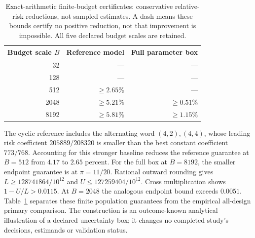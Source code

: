 \begin{table}[t]
\centering
\caption{Exact-arithmetic finite-budget certificates: conservative relative-risk reductions, not sampled estimates.
A dash means these bounds certify no positive reduction, not that improvement is impossible.
All five declared budget scales are retained.}
\label{tab:finite-robust-certificate}
\begin{tabular}{rrr}
\toprule
Budget scale $B$ & Reference model & Full parameter box\\
\midrule
32 & --- & ---\\
128 & --- & ---\\
512 & $\ge2.65\%$ & ---\\
2048 & $\ge5.21\%$ & $\ge0.51\%$\\
8192 & $\ge5.81\%$ & $\ge1.15\%$\\
\bottomrule
\end{tabular}
\end{table}

The cyclic reference includes the alternating word $(4,2),(4,4)$, whose leading risk coefficient $205889/208320$ is smaller than the best constant coefficient $773/768$.
Accounting for this stronger baseline reduces the reference guarantee at $B=512$ from $4.17$ to $2.65$ percent.
For the full box at $B=8192$, the smaller endpoint guarantee is at $\pi=11/20$.
Rational outward rounding gives $L\ge128741864/10^{12}$ and $U\le127259404/10^{12}$.
Cross multiplication shows $1-U/L>0.0115$.
At $B=2048$ the analogous endpoint bound exceeds $0.0051$.
Table~\ref{tab:finite-robust-certificate} separates these finite population guarantees from the empirical all-design primary comparison.
The construction is an outcome-known analytical illustration of a declared uncertainty box; it changes no completed study's decisions, estimands or validation status.

